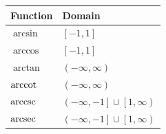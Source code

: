 \begin{table}[H]
	\centering
	\begin{tabular}{l|l}
		Function  & Domain                                                 \\ \hline
		$\arcsin$ & $\left[-1, 1\right]$           						   \\
		$\arccos$ & $\left[-1, 1\right]$                                   \\
		$\arctan$ & $\left(-\infty, \infty\right)$                         \\
		$\operatorname{arccot}$ & $\left(-\infty, \infty\right)$                         \\
		$\operatorname{arccsc}$ & $\left(-\infty, -1\right] \cup \left[1, \infty\right)$ \\
		$\operatorname{arcsec}$ & $\left(-\infty, -1\right] \cup \left[1, \infty\right)$
	\end{tabular}
\end{table}
